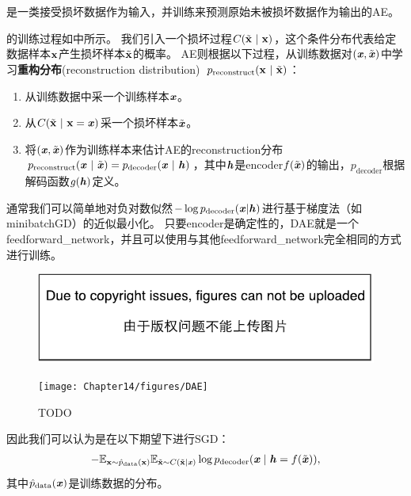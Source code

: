 \section{}
\label{sec:denoising_autoencoders}
是一类接受损坏数据作为输入，并训练来预测原始未被损坏数据作为输出的\gls{AE}。


的训练过程如中所示。
我们引入一个损坏过程$C(\tilde{\mathbf{x}} ~|~ \mathbf{x})$，这个条件分布代表给定数据样本$\mathbf{x}$产生损坏样本$\tilde {\mathbf{x}}$的概率。
\gls{AE}则根据以下过程，从训练数据对$(\boldsymbol{\mathit{x}}, \tilde {\boldsymbol{\mathit{x}}})$中学习\textbf{重构分布}(reconstruction distribution)~$p_{\text{reconstruct}} (\mathbf{x} ~|~ \tilde {\mathbf{x}})$：
\begin{enumerate}
\item 从训练数据中采一个训练样本$\boldsymbol{\mathit{x}}$。
\item 从$C(\tilde{\mathbf{x}} ~|~ \mathbf{x}=\boldsymbol{\mathit{x}})$采一个损坏样本$\tilde {\boldsymbol{\mathit{x}}}$。
\item 将$(\boldsymbol{\mathit{x}}, \tilde {\boldsymbol{\mathit{x}}})$作为训练样本来估计\gls{AE}的\gls{reconstruction}分布 
$p_{\text{reconstruct}} (\boldsymbol{\mathit{x}} ~|~ \tilde {\boldsymbol{\mathit{x}}}) = p_{\text{decoder}}(\boldsymbol{\mathit{x}} ~|~\boldsymbol{\mathit{h}})$，其中$\boldsymbol{\mathit{h}}$是\gls{encoder}$f(\tilde {\boldsymbol{\mathit{x}}})$的输出，$p_{\text{decoder}}$根据解码函数$g(\boldsymbol{\mathit{h}})$定义。
\end{enumerate}
通常我们可以简单地对负对数似然$-\log p_{\text{decoder}} (\boldsymbol{\mathit{x}} | \boldsymbol{\mathit{h}})$进行基于梯度法（如\gls{minibatch}\gls{GD}）的近似最小化。
只要\gls{encoder}是确定性的，\gls{DAE}就是一个\gls{feedforward_network}，并且可以使用与其他\gls{feedforward_network}完全相同的方式进行训练。

\begin{figure}[!htb]
\ifOpenSource
\centerline{\includegraphics{figure.pdf}}
\else
\centerline{\texttt{[image: Chapter14/figures/DAE]}}
\fi
\caption{TODO}
\label{fig:chap14_DAE}
\end{figure}

因此我们可以认为是在以下期望下进行\gls{SGD}：
\begin{align}
   - \mathbb{E}_{\mathbf{x} \sim \hat{p}_{\text{data}}(\mathbf{x})} \mathbb{E}_{\tilde{\mathbf{x}} \sim C(\tilde{\mathbf{x}}\mid\boldsymbol{\mathit{x}})} \log p_{\text{decoder}}(\boldsymbol{\mathit{x}} \mid \boldsymbol{\mathit{h}} = f(\tilde{\boldsymbol{\mathit{x}}})),
\end{align}
其中$\hat{p}_{\text{data}}(\boldsymbol{\mathit{x}})$是训练数据的分布。

